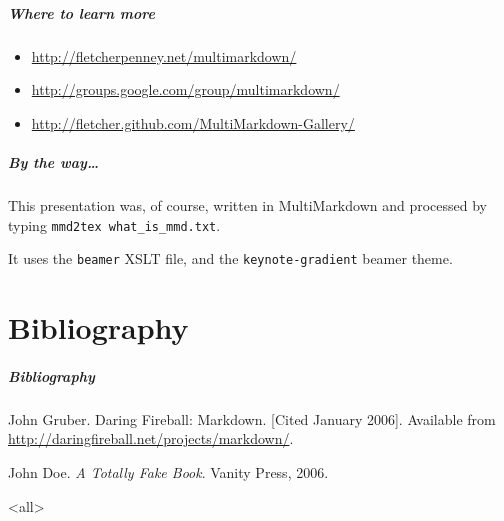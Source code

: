 \begin{frame}[fragile]
\frametitle{Where to learn more }
\label{wheretolearnmore}

\begin{itemize}
\item{} \href{http://fletcherpenney.net/multimarkdown/}{http:\slash \slash fletcherpenney.net\slash multimarkdown\slash }

\item{} \href{http://groups.google.com/group/multimarkdown/}{http:\slash \slash groups.google.com\slash group\slash multimarkdown\slash }

\item{} \href{http://fletcher.github.com/MultiMarkdown-Gallery/}{http:\slash \slash fletcher.github.com\slash MultiMarkdown-Gallery\slash }

\end{itemize}

\end{frame}

\begin{frame}[fragile]
\frametitle{By the way{\ldots} }
\label{bytheway...}

This presentation was, of course, written in MultiMarkdown and processed by
typing \texttt{mmd2tex what\_is\_mmd.txt}.

It uses the \texttt{beamer} XSLT file, and the \texttt{keynote-gradient} beamer theme.
\end{frame}

\part{Bibliography}
\begin{frame}[allowframebreaks]
\frametitle{Bibliography}
\def\newblock{}
\begin{thebibliography}{0}

John Gruber. Daring Fireball: Markdown. [Cited January 2006]. Available from \href{http://daringfireball.net/projects/markdown/}{http:\slash \slash daringfireball.net\slash projects\slash markdown\slash }.



John Doe. \emph{A Totally Fake Book}. Vanity Press, 2006.


\end{thebibliography}
\end{frame}

\mode<all>
\mode*

